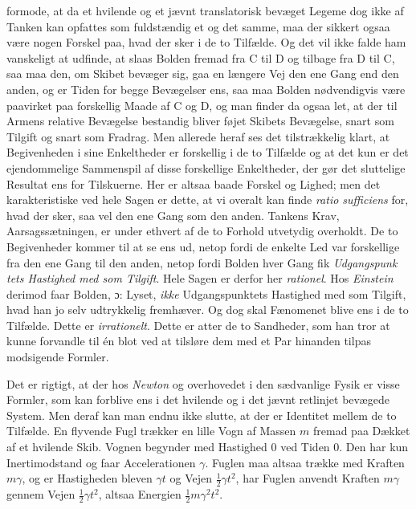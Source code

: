 \documentclass[12pt,a4paper]{article}
\newcommand{\opage}[1]{\marginnote{\footnotesize\textit{[#1]}}}
\begin{document}
formode, at da et hvilende og et jævnt translatorisk bevæget Legeme dog
ikke af Tanken kan opfattes som fuldstændig et og det samme, maa der
sikkert ogsaa være nogen Forskel paa, hvad der sker i de to Tilfælde. Og
det vil ikke falde ham vanskeligt at udfinde, at slaas Bolden fremad fra C
til D og tilbage fra D til C, saa maa den, om Skibet bevæger sig, gaa en
længere Vej den ene Gang end den anden, og er Tiden for begge Bevægelser
ens, saa maa Bolden nødvendigvis være paavirket paa forskellig Maade af C
og D, og man finder da ogsaa let, at der til Armens relative Bevægelse
bestandig bliver føjet Skibets Bevægelse, snart som Tilgift og snart som
Fradrag. Men allerede heraf ses det tilstrækkelig klart, at Begivenheden i
sine Enkeltheder er forskellig i de to Tilfælde og at det kun er det
ejendommelige Sammenspil af disse forskellige Enkeltheder, der gør det
sluttelige Resultat ens for Tilskuerne. Her er altsaa baade Forskel og
Lighed; men det karakteristiske ved hele Sagen er dette, at vi overalt kan
finde \textit{ratio sufficiens} for, hvad der sker, saa vel den ene Gang
som den anden. Tankens Krav, Aarsagssætningen, er under ethvert af de to
Forhold utvetydig overholdt. De to Begivenheder kommer til at se ens ud,
netop fordi de enkelte Led var forskellige fra den ene Gang til den anden,
netop fordi Bolden hver Gang fik \emph{Udgangspunk\-%
\opage{19}tets Hastighed med som Tilgift}. Hele Sagen er derfor her
\emph{rationel}. Hos \emph{Einstein} derimod faar Bolden, ɔ: Lyset,
\emph{ikke} Udgangspunktets Hastighed med som Tilgift, hvad han jo selv
udtrykkelig fremhæver. Og dog skal Fænomenet blive ens i de to Tilfælde.
Dette er \emph{irrationelt}. Dette er atter de to Sandheder, som han tror
at kunne forvandle til én blot ved at tilsløre dem med et Par hinanden
tilpas modsigende Formler.

Det er rigtigt, at der hos \emph{Newton} og overhovedet i den sædvanlige
Fysik er visse Formler, som kan forblive ens i det hvilende og i det jævnt
retlinjet bevægede System. Men deraf kan man endnu ikke slutte, at der er
Identitet mellem de to Tilfælde. En flyvende Fugl trækker en lille Vogn af
Massen $m$ fremad paa Dækket af et hvilende Skib. Vognen begynder med
Hastighed 0 ved Tiden 0. Den har kun Inertimodstand og faar Accelerationen
$\gamma$. Fuglen maa altsaa trække med Kraften $m\gamma$, og er Hastigheden
bleven $\gamma t$ og Vejen $\tfrac{1}{2}\gamma t^{2}$, har Fuglen anvendt
Kraften $m\gamma$ gennem Vejen $\tfrac{1}{2}\gamma t^{2}$, altsaa Energien
$\tfrac{1}{2}m\gamma^{2}t^{2}$.
\end{document}
